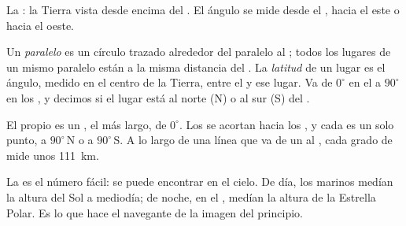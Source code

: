 \begin{omfigure}
\begin{minipage}[t]{0.48\linewidth}
{\small La : la Tierra vista desde encima del . El ángulo
se mide desde el , hacia el este o hacia el oeste.}
\end{minipage}
\end{omfigure}

\begin{definition}\label{def:g6:latitude-longitude:latitude}
Un \emph{paralelo} es un círculo trazado alrededor del 
paralelo al ; todos los lugares de un mismo paralelo están a la misma
distancia del . La \emph{latitud} de un lugar es el
ángulo, medido en el centro de la Tierra, entre el  y ese lugar. Va
de $0^\circ$ en el  a $90^\circ$ en los , y decimos si el lugar
está al norte (N) o al sur (S) del .
\end{definition}

El propio  es un , el más largo, de  $0^\circ$. Los
 se acortan hacia los , y cada  es un solo punto, a
$90^\circ$\,N o a $90^\circ$\,S. A lo largo de una línea que va de un 
al , cada grado de  mide unos \qty{111}{km}.

La  es el número fácil: se puede encontrar en el cielo. De día, los
marinos medían la altura del Sol a mediodía; de noche, en el , medían la altura de la Estrella Polar. Es lo que hace el navegante
de la imagen del principio.

